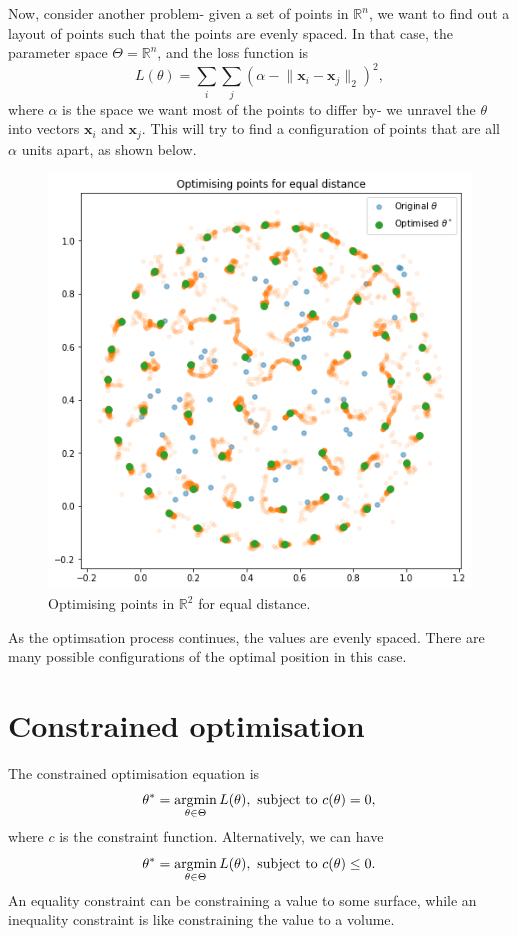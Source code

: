 \documentclass[a4paper, openany]{memoir}
\begin{document}
Now, consider another problem- given a set of points in $\mathbb{R}^n$, we want to find out a layout of points such that the points are evenly spaced. In that case, the parameter space $\Theta = \mathbb{R}^n$, and the loss function is
\[L(\theta) = \sum_i \sum_j (\alpha - \lVert \mathbf{x}_i - \mathbf{x}_j \rVert_2)^2,\]
where $\alpha$ is the space we want most of the points to differ by- we unravel the $\theta$ into vectors $\mathbf{x}_i$ and $\mathbf{x}_j$. This will try to find a configuration of points that are all $\alpha$ units apart, as shown below.
\begin{figure}[H]
    \centering
    \includegraphics[scale=0.5]{src/4.3 optimising points for equal distance.png}
    \caption{Optimising points in $\mathbb{R}^2$ for equal distance.}
\end{figure}
\noindent As the optimsation process continues, the values are evenly spaced. There are many possible configurations of the optimal position in this case.
\newpage

\section{Constrained optimisation}
The constrained optimisation equation is
\[\theta^* = \operatornamewithlimits{arg min}_{\theta \in \Theta} L(\theta), \text{ subject to } c(\theta) = 0,\]
where $c$ is the constraint function. Alternatively, we can have
\[\theta^* = \operatornamewithlimits{arg min}_{\theta \in \Theta} L(\theta), \text{ subject to } c(\theta) \leq 0.\]
An equality constraint can be constraining a value to some surface, while an inequality constraint is like constraining the value to a volume.
\end{document}
